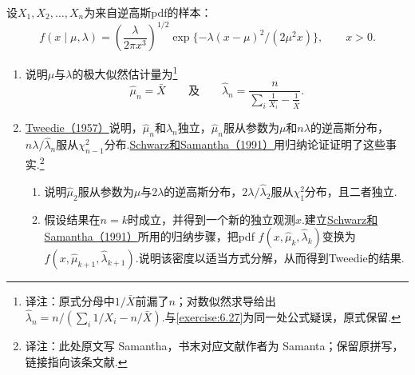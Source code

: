 \begin{exercise}\label{exercise:7.15}
设$X_1,X_2,\ldots,X_n$为来自逆高斯pdf的样本：
$$f(x\mid\mu,\lambda)=\left(\frac\lambda{2\pi x^3}\right)^{1/2}\exp\{-\lambda(x-\mu)^2/(2\mu^2x)\},\qquad x>0.$$
\begin{enumerate}[label=(\alph*)]
\item 说明$\mu$与$\lambda$的极大似然估计量为\footnote{译注：原式分母中$1/\bar X$前漏了$n$；对数似然求导给出$\widehat\lambda_n=n/(\sum_i1/X_i-n/\bar X)$.与\autoref{exercise:6.27}为同一处公式疑误，原式保留.}
$$\widehat\mu_n=\bar X\qquad\text{及}\qquad\widehat\lambda_n=\frac n{\sum_i\frac1{X_i}-\frac1{\bar X}}.$$
\item \hyperref[bib:source319]{Tweedie（1957）}说明，$\widehat\mu_n$和$\widehat\lambda_n$独立，$\widehat\mu_n$服从参数为$\mu$和$n\lambda$的逆高斯分布，$n\lambda/\widehat\lambda_n$服从$\chi_{n-1}^2$分布.\hyperref[bib:source281]{Schwarz和Samantha（1991）}用归纳论证证明了这些事实.\footnote{译注：此处原文写 Samantha，书末对应文献作者为 Samanta；保留原拼写，链接指向该条文献.}
\begin{enumerate}[label=(\roman*)]
\item 说明$\widehat\mu_2$服从参数为$\mu$与$2\lambda$的逆高斯分布，$2\lambda/\widehat\lambda_2$服从$\chi_1^2$分布，且二者独立.
\item 假设结果在$n=k$时成立，并得到一个新的独立观测$x$.建立\hyperref[bib:source281]{Schwarz和Samantha（1991）}所用的归纳步骤，把pdf $f(x,\widehat\mu_k,\widehat\lambda_k)$变换为$f(x,\widehat\mu_{k+1},\widehat\lambda_{k+1})$.说明该密度以适当方式分解，从而得到Tweedie的结果.
\end{enumerate}
\end{enumerate}
\end{exercise}
